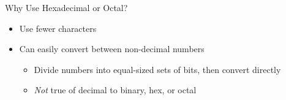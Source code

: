 \documentclass[graphics]{beamer}
\begin{document}
\begin{frame}{Why Use Hexadecimal or Octal?}
    \begin{itemize}
        \item Use fewer characters
        \item Can easily convert between non-decimal numbers
        \begin{itemize}
            \item Divide numbers into equal-sized sets of bits, then convert directly
            \item \textit{Not} true of decimal to binary, hex, or octal
        \end{itemize}
    \end{itemize}
\end{frame}
\end{document}
